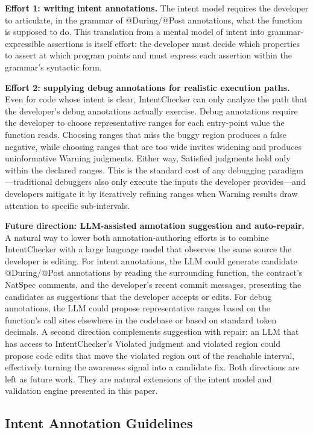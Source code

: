 \documentclass[pdflatex,sn-basic]{sn-jnl}%
\theoremstyle{thmstyleone}%
\theoremstyle{thmstyletwo}%
\theoremstyle{thmstylethree}%
\begin{document}
\smallskip
\noindent\textbf{Effort 1: writing intent annotations.}
The intent model requires the developer to articulate, in the grammar of @During/@Post annotations, what the function is supposed to do. This translation from a mental model of intent into grammar-expressible assertions is itself effort: the developer must decide which properties to assert at which program points and must express each assertion within the grammar's syntactic form.

\smallskip
\noindent\textbf{Effort 2: supplying debug annotations for realistic execution paths.}
Even for code whose intent is clear, IntentChecker can only analyze the path that the developer's debug annotations actually exercise.
Debug annotations require the developer to choose representative ranges for each entry-point value the function reads. Choosing ranges that miss the buggy region produces a false negative, while choosing ranges that are too wide invites widening and produces uninformative Warning judgments. Either way, Satisfied judgments hold only within the declared ranges.
This is the standard cost of any debugging paradigm---traditional debuggers also only execute the inputs the developer provides---and developers mitigate it by iteratively refining ranges when Warning results draw attention to specific sub-intervals.

\smallskip
\noindent\textbf{Future direction: LLM-assisted annotation suggestion and auto-repair.}
A natural way to lower both annotation-authoring efforts is to combine IntentChecker with a large language model that observes the same source the developer is editing.
For intent annotations, the LLM could generate candidate @During/@Post annotations by reading the surrounding function, the contract's NatSpec comments, and the developer's recent commit messages, presenting the candidates as suggestions that the developer accepts or edits.
For debug annotations, the LLM could propose representative ranges based on the function's call sites elsewhere in the codebase or based on standard token decimals.
A second direction complements suggestion with repair: an LLM that has access to IntentChecker's Violated judgment and violated region could propose code edits that move the violated region out of the reachable interval, effectively turning the awareness signal into a candidate fix.
Both directions are left as future work. They are natural extensions of the intent model and validation engine presented in this paper.

\subsection{Intent Annotation Guidelines}\label{sec:disc:guidelines}
\end{document}
